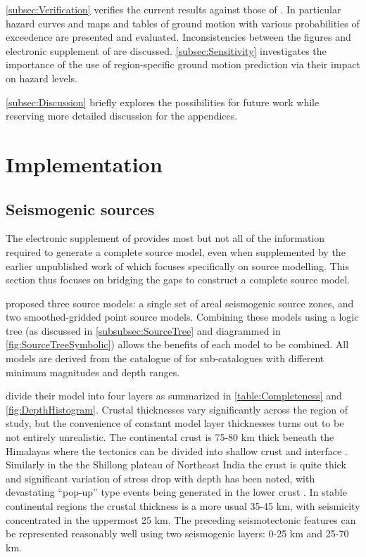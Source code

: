 \documentclass{article}
\begin{document}
\autoref{subsec:Verification} verifies the current results against those of  \cite{nath2012probabilistic}.
In particular hazard curves and maps and tables of ground motion with various probabilities of exceedence are presented and evaluated.
Inconsistencies between the figures and electronic supplement of \cite{nath2012probabilistic} are discussed.
\autoref{subsec:Sensitivity} investigates the importance of the use of region-specific ground motion prediction via their impact on hazard levels.

\autoref{subsec:Discussion} briefly explores the possibilities for future work while reserving more detailed discussion for the appendices.

\section{Implementation}
\label{sec:Implementation}

\subsection{Seismogenic sources}
\label{subsec:Sources}

The electronic supplement of \cite{nath2012probabilistic} provides most but not all of the information required to generate a complete source model, even when supplemented by the earlier unpublished work of \cite{thingbaijam2011seismogenic} which focuses specifically on source modelling.
This section thus focuses on bridging the gaps to construct a complete source model.

\cite{nath2012probabilistic} proposed three source models: a single set of areal seismogenic source zones, and two smoothed-gridded point source models.
Combining these models using a logic tree (as discussed in \autoref{subsubsec:SourceTree} and diagrammed in  \autoref{fig:SourceTreeSymbolic}) allows the benefits of each model to be combined.
All models are derived from the catalogue of \cite{nath2010earthquake} for sub-catalogues with different minimum magnitudes and depth ranges.

\cite{thingbaijam2011seismogenic} divide their model into four layers as summarized in \autoref{table:Completeness} and \autoref{fig:DepthHistogram}.
Crustal thicknesses vary significantly across the region of study, but the convenience of constant model layer thicknesses turns out to be not entirely unrealistic.
The continental crust is 75-80 km thick beneath the Himalayas where the tectonics can be divided into shallow crust and interface \citep{thingbaijam2011seismogenic}.
Similarly in the the Shillong plateau of Northeast India the crust is quite thick and significant variation of stress drop with depth has been noted, with devastating ``pop-up'' type events \cite{bilham2001plateau} being generated in the lower crust \citep{nath2012ground}.
In stable continental regions the crustal thickness is a more usual 35-45 km, with seismicity concentrated in the uppermost 25 km.
The preceding seismotectonic features can be represented reasonably well using two seismogenic layers: 0-25 km and 25-70 km.
\end{document}

